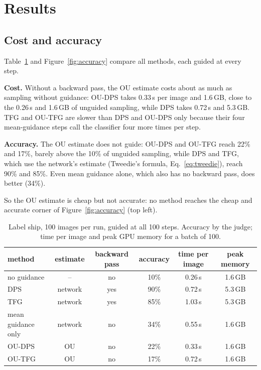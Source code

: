 \documentclass[11pt]{article}
\begin{document}
\section{Results}

\subsection{Cost and accuracy}
Table~\ref{tab:main} and Figure~\ref{fig:accuracy} compare all methods, each guided at every step.

\textbf{Cost.} Without a backward pass, the OU estimate costs about as much as sampling without guidance: OU-DPS takes
0.33\,s per image and 1.6\,GB, close to the 0.26\,s and 1.6\,GB of unguided sampling, while DPS takes 0.72\,s and
5.3\,GB. TFG and OU-TFG are slower than DPS and OU-DPS only because their four mean-guidance steps call the classifier
four more times per step.

\textbf{Accuracy.} The OU estimate does not guide: OU-DPS and OU-TFG reach 22\% and 17\%, barely above the 10\% of
unguided sampling, while DPS and TFG, which use the network's estimate (Tweedie's formula, Eq.~\eqref{eq:tweedie}),
reach 90\% and 85\%. Even mean guidance alone,
which also has no backward pass, does better (34\%).

So the OU estimate is cheap but not accurate: no method reaches the cheap and accurate corner of Figure~\ref{fig:accuracy}
(top left).

\begin{table}[h]
\centering\small
\begin{tabular}{lccccc}
\toprule
method & estimate & backward pass & accuracy & time per image & peak memory \\
\midrule
no guidance        & --      & no  & 10\% & 0.26\,s & 1.6\,GB \\
DPS                & network & yes & 90\% & 0.72\,s & 5.3\,GB \\
TFG                & network & yes & 85\% & 1.03\,s & 5.3\,GB \\
mean guidance only & network & no  & 34\% & 0.55\,s & 1.6\,GB \\
OU-DPS             & OU      & no  & 22\% & 0.33\,s & 1.6\,GB \\
OU-TFG             & OU      & no  & 17\% & 0.72\,s & 1.6\,GB \\
\bottomrule
\end{tabular}
\caption{Label ship, 100 images per run, guided at all 100 steps. Accuracy by the judge; time per image and peak GPU
memory for a batch of 100.}
\label{tab:main}
\end{table}
\end{document}
